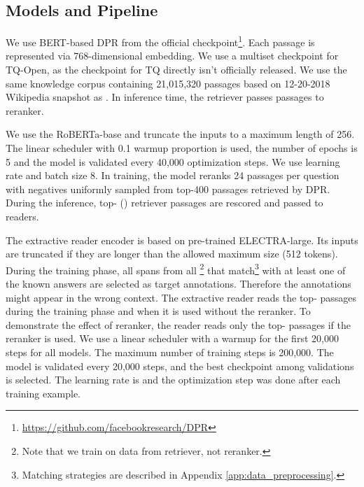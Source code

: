 \documentclass[11pt]{article}
\begin{document}
\subsection{Models and Pipeline}
\label{ss:models_and_pipeline}
\begin{description}[style=unboxed,leftmargin=0em,listparindent=\parindent]
\setlength\parskip{0em}



\item[Retriever.]
We use BERT-based DPR from the official checkpoint\footnote{\url{https://github.com/facebookresearch/DPR}}. Each passage is represented via 768-dimensional embedding. We use a multiset checkpoint for TQ-Open, as the checkpoint for TQ directly isn't officially released.
We use the same knowledge corpus containing 21,015,320 passages based on 12-20-2018 Wikipedia snapshot as \citet{karpukhin2020dense}. In inference time, the retriever passes  passages  to reranker.

\item[Passage reranker.]
We use the RoBERTa-base \cite{liu2019roberta} and truncate the inputs to a maximum length of 256. The linear scheduler with 0.1 warmup proportion is used, the number of epochs is 5 and the model is validated every 40,000 optimization steps. 
We use learning rate  and batch size 8. In training, the model reranks 24 passages per question with negatives uniformly sampled from top-400 passages retrieved by DPR.
During the inference, top- () retriever passages are rescored and passed to readers.

\item[Extractive reader.] The extractive reader encoder is based on pre-trained ELECTRA-large. 
Its inputs are truncated if they are longer than the allowed maximum size (512 tokens). 
During the training phase, all spans from all \footnote{Note that we train on data from retriever, not reranker.} that match\footnote{Matching strategies are described in Appendix \ref{app:data_preprocessing}.} with at least one of the known answers are selected as target annotations. 
Therefore the annotations might appear in the wrong context. 
The extractive reader reads the top- passages during the training phase and when it is used without the reranker. 
To demonstrate the effect of reranker, the reader reads only the top- passages if the reranker is used.
We use a linear scheduler with a warmup for the first 20,000 steps for all models. 
The maximum number of training steps is 200,000. 
The model is validated every 20,000 steps, and the best checkpoint among validations is selected. 
The learning rate is  and the optimization step was done after each training example.


\end{description}
\end{document}
